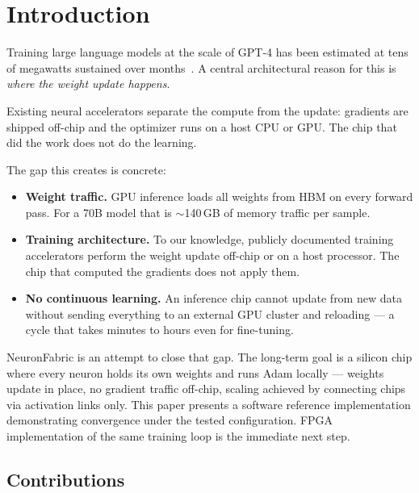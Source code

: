 \documentclass[11pt]{article}
\begin{document}
\section{Introduction}

Training large language models at the scale of GPT-4 has been estimated at tens of megawatts
sustained over months~\cite{patterson2022carbon}.
A central architectural reason for this is \emph{where the weight update happens}.

Existing neural accelerators separate the compute from the update: gradients are shipped
off-chip and the optimizer runs on a host CPU or GPU.
The chip that did the work does not do the learning.

The gap this creates is concrete:

\begin{itemize}
  \item \textbf{Weight traffic.} GPU inference loads all weights from HBM on every
    forward pass. For a 70B model that is $\sim$140\,GB of memory traffic per sample.
  \item \textbf{Training architecture.} To our knowledge, publicly documented training
    accelerators perform the weight update off-chip or on a host processor.
    The chip that computed the gradients does not apply them.
  \item \textbf{No continuous learning.} An inference chip cannot update from new data
    without sending everything to an external GPU cluster and reloading --- a cycle
    that takes minutes to hours even for fine-tuning.
\end{itemize}

NeuronFabric is an attempt to close that gap. The long-term goal is a silicon chip
where every neuron holds its own weights and runs Adam locally --- weights update in
place, no gradient traffic off-chip, scaling achieved by connecting chips via
activation links only. This paper presents a software reference implementation demonstrating convergence under the tested configuration. FPGA implementation of the same training loop is the immediate next step.

\subsection{Contributions}
\end{document}
